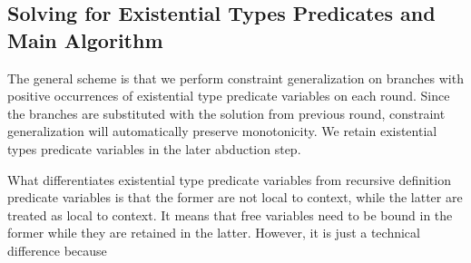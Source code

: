 \documentclass{article}
\begin{document}
\subsection{Solving for Existential Types Predicates and Main
Algorithm}\label{MainAlgoBody}

The general scheme is that we perform constraint generalization on branches
with positive occurrences of existential type predicate variables on each
round. Since the branches are substituted with the solution from previous
round, constraint generalization will automatically preserve monotonicity. We
retain existential types predicate variables in the later abduction step.

What differentiates existential type predicate variables from recursive
definition predicate variables is that the former are not local to context,
while the latter are treated as local to context. It means that free variables
need to be bound in the former while they are retained in the latter. However,
it is just a technical difference because
\end{document}

